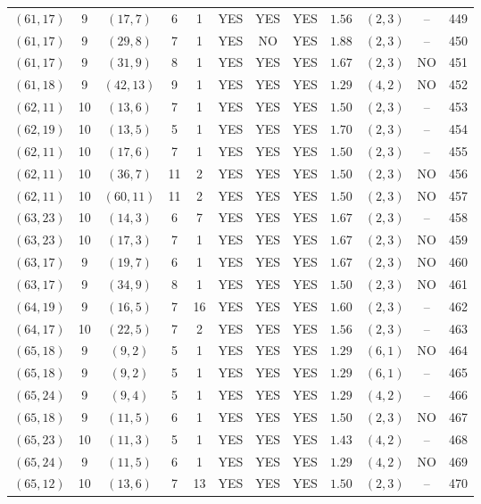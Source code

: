 \begin{longtable}{|c|c|c|c|c|c|c|c|c|c|c|c|}
$(61,17)$ & 9 & $(17,7)$ & 6 & 1 & YES & YES & YES & $1.56$ & $(2,3)$ & -- & 449\\
$(61,17)$ & 9 & $(29,8)$ & 7 & 1 & YES & NO & YES & $1.88$ & $(2,3)$ & -- & 450\\
$(61,17)$ & 9 & $(31,9)$ & 8 & 1 & YES & YES & YES & $1.67$ & $(2,3)$ & NO & 451\\
$(61,18)$ & 9 & $(42,13)$ & 9 & 1 & YES & YES & YES & $1.29$ & $(4,2)$ & NO & 452\\
$(62,11)$ & 10 & $(13,6)$ & 7 & 1 & YES & YES & YES & $1.50$ & $(2,3)$ & -- & 453\\
$(62,19)$ & 10 & $(13,5)$ & 5 & 1 & YES & YES & YES & $1.70$ & $(2,3)$ & -- & 454\\
$(62,11)$ & 10 & $(17,6)$ & 7 & 1 & YES & YES & YES & $1.50$ & $(2,3)$ & -- & 455\\
$(62,11)$ & 10 & $(36,7)$ & 11 & 2 & YES & YES & YES & $1.50$ & $(2,3)$ & NO & 456\\
$(62,11)$ & 10 & $(60,11)$ & 11 & 2 & YES & YES & YES & $1.50$ & $(2,3)$ & NO & 457\\
$(63,23)$ & 10 & $(14,3)$ & 6 & 7 & YES & YES & YES & $1.67$ & $(2,3)$ & -- & 458\\
$(63,23)$ & 10 & $(17,3)$ & 7 & 1 & YES & YES & YES & $1.67$ & $(2,3)$ & NO & 459\\
$(63,17)$ & 9 & $(19,7)$ & 6 & 1 & YES & YES & YES & $1.67$ & $(2,3)$ & NO & 460\\
$(63,17)$ & 9 & $(34,9)$ & 8 & 1 & YES & YES & YES & $1.50$ & $(2,3)$ & NO & 461\\
$(64,19)$ & 9 & $(16,5)$ & 7 & 16 & YES & YES & YES & $1.60$ & $(2,3)$ & -- & 462\\
$(64,17)$ & 10 & $(22,5)$ & 7 & 2 & YES & YES & YES & $1.56$ & $(2,3)$ & -- & 463\\
$(65,18)$ & 9 & $(9,2)$ & 5 & 1 & YES & YES & YES & $1.29$ & $(6,1)$ & NO & 464\\
$(65,18)$ & 9 & $(9,2)$ & 5 & 1 & YES & YES & YES & $1.29$ & $(6,1)$ & -- & 465\\
$(65,24)$ & 9 & $(9,4)$ & 5 & 1 & YES & YES & YES & $1.29$ & $(4,2)$ & -- & 466\\
$(65,18)$ & 9 & $(11,5)$ & 6 & 1 & YES & YES & YES & $1.50$ & $(2,3)$ & NO & 467\\
$(65,23)$ & 10 & $(11,3)$ & 5 & 1 & YES & YES & YES & $1.43$ & $(4,2)$ & -- & 468\\
$(65,24)$ & 9 & $(11,5)$ & 6 & 1 & YES & YES & YES & $1.29$ & $(4,2)$ & NO & 469\\
$(65,12)$ & 10 & $(13,6)$ & 7 & 13 & YES & YES & YES & $1.50$ & $(2,3)$ & -- & 470\\

\end{longtable}
